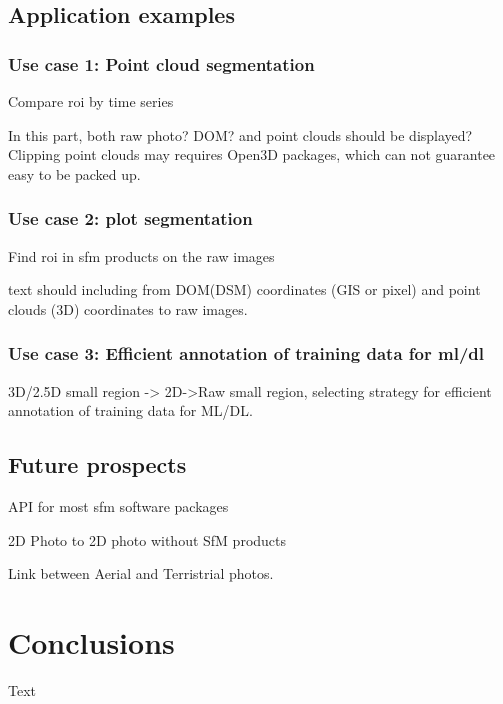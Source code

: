 \documentclass{configs/bmcart}
\begin{document}
\subsection*{Application examples}

\subsubsection*{Use case 1: Point cloud segmentation}
Compare \acrshort{roi} by time series

In this part, both raw photo? DOM? and point clouds should be displayed? Clipping point clouds may requires Open3D packages, which can not guarantee easy to be packed up.

\subsubsection*{Use case 2: plot segmentation}

Find \acrshort{roi} in \acrshort{sfm} products on the raw images

text \cite{ma_calculation_2019, guo_illumination_2013}
should including from DOM(DSM) coordinates (GIS or pixel) and point clouds (3D) coordinates to raw images.

\subsubsection*{Use case 3: Efficient annotation of training data for \acrshort{ml}/\acrshort{dl}}
3D/2.5D small region -> 2D->Raw small region, selecting strategy for efficient annotation of training data for ML/DL.

\subsection*{Future prospects}
API for most \acrshort{sfm} software packages

2D Photo to 2D photo without SfM products

Link between Aerial and Terristrial photos.

\section*{Conclusions}
Text
\end{document}
